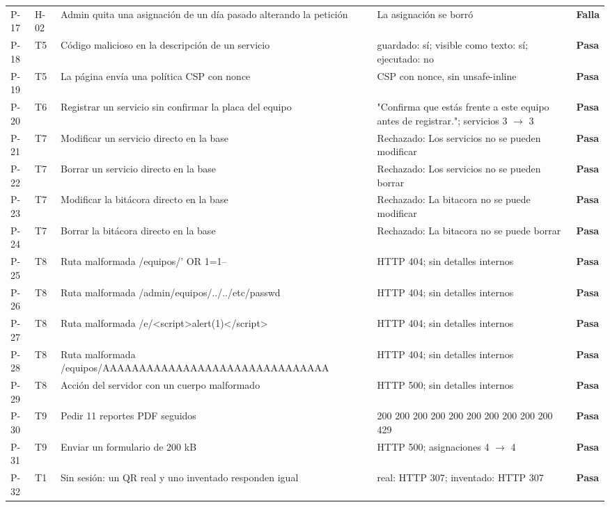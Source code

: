 \documentclass[12pt, letterpaper]{article}
\begin{document}
\begin{longtable}{L{0.07}L{0.11}L{0.34}L{0.32}L{0.08}}
P-17 & H-02 & Admin quita una asignación de un día pasado alterando la petición & La asignación se borró & \textbf{\textcolor{red!70!black}{Falla}} \\
P-18 & T5 & Código malicioso en la descripción de un servicio & guardado: sí; visible como texto: sí; ejecutado: no & \textbf{Pasa} \\
P-19 & T5 & La página envía una política CSP con nonce & CSP con nonce, sin unsafe-inline & \textbf{Pasa} \\
P-20 & T6 & Registrar un servicio sin confirmar la placa del equipo & "Confirma que estás frente a este equipo antes de registrar."; servicios 3 $\rightarrow$ 3 & \textbf{Pasa} \\
P-21 & T7 & Modificar un servicio directo en la base & Rechazado: Los servicios no se pueden modificar & \textbf{Pasa} \\
P-22 & T7 & Borrar un servicio directo en la base & Rechazado: Los servicios no se pueden borrar & \textbf{Pasa} \\
P-23 & T7 & Modificar la bitácora directo en la base & Rechazado: La bitacora no se puede modificar & \textbf{Pasa} \\
P-24 & T7 & Borrar la bitácora directo en la base & Rechazado: La bitacora no se puede borrar & \textbf{Pasa} \\
P-25 & T8 & Ruta malformada /equipos/' OR 1=1-- & HTTP 404; sin detalles internos & \textbf{Pasa} \\
P-26 & T8 & Ruta malformada /admin/equipos/../../etc/passwd & HTTP 404; sin detalles internos & \textbf{Pasa} \\
P-27 & T8 & Ruta malformada /e/\textless{}script\textgreater{}alert(1)\textless{}/script\textgreater{} & HTTP 404; sin detalles internos & \textbf{Pasa} \\
P-28 & T8 & Ruta malformada /equipos/AAAAAAAAAAAAAAAAAAAAAAAAAAAAAAA & HTTP 404; sin detalles internos & \textbf{Pasa} \\
P-29 & T8 & Acción del servidor con un cuerpo malformado & HTTP 500; sin detalles internos & \textbf{Pasa} \\
P-30 & T9 & Pedir 11 reportes PDF seguidos & 200 200 200 200 200 200 200 200 200 200 429 & \textbf{Pasa} \\
P-31 & T9 & Enviar un formulario de 200 kB & HTTP 500; asignaciones 4 $\rightarrow$ 4 & \textbf{Pasa} \\
P-32 & T1 & Sin sesión: un QR real y uno inventado responden igual & real: HTTP 307; inventado: HTTP 307 & \textbf{Pasa} \\

\end{longtable}
\end{document}
